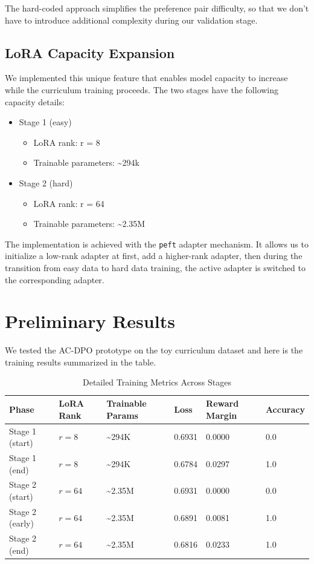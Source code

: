 \documentclass{article}
\begin{document}
The hard-coded approach simplifies the preference pair difficulty, so that we don't have to introduce additional complexity during our validation stage.

\subsection{LoRA Capacity Expansion}
We implemented this unique feature that enables model capacity to increase while the curriculum training proceeds. The two stages have the following capacity details:
\begin{itemize}
    \item Stage 1 (easy)
    \begin{itemize}
        \item LoRA rank: r = 8
        \item Trainable parameters: \textasciitilde 294k
    \end{itemize}
    \item Stage 2 (hard)
    \begin{itemize}
        \item LoRA rank: r = 64
        \item Trainable parameters: \textasciitilde 2.35M
    \end{itemize}
\end{itemize}
The implementation is achieved with the \texttt{peft} adapter mechanism. It allows us to initialize a low-rank adapter at first, add a higher-rank adapter, then during the transition from easy data to hard data training, the active adapter is switched to the corresponding adapter.

\section{Preliminary Results}
We tested the AC-DPO prototype on the toy curriculum dataset and here is the training results summarized in the table.

\begin{table}[h]
\centering
\caption{Detailed Training Metrics Across Stages}
\begin{tabular}{llllll}
\toprule
\textbf{Phase} & \textbf{LoRA Rank} & \textbf{Trainable Params} & \textbf{Loss} & \textbf{Reward Margin} & \textbf{Accuracy} \\
\midrule
Stage 1 (start) & $r = 8$  & \textasciitilde{}294K  & 0.6931 & 0.0000 & 0.0 \\
Stage 1 (end)   & $r = 8$  & \textasciitilde{}294K  & 0.6784 & 0.0297 & 1.0 \\
Stage 2 (start) & $r = 64$ & \textasciitilde{}2.35M & 0.6931 & 0.0000 & 0.0 \\
Stage 2 (early) & $r = 64$ & \textasciitilde{}2.35M & 0.6891 & 0.0081 & 1.0 \\
Stage 2 (end)   & $r = 64$ & \textasciitilde{}2.35M & 0.6816 & 0.0233 & 1.0 \\
\bottomrule
\end{tabular}
\label{tab:training_metrics}
\end{table}
\end{document}
